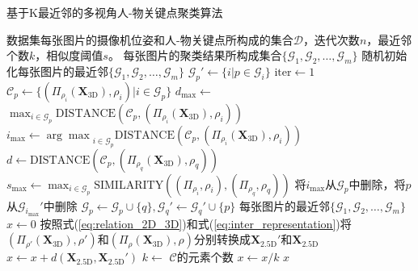 \begin{algorithm}[!htbp]
	\small
	\caption{基于K最近邻的多视角人-物关键点聚类算法}\label{alg:knn}
	\renewcommand{\algorithmicrequire}{\textbf{输入：}}
	\renewcommand{\algorithmicensure}{\textbf{输出：}}
	\begin{algorithmic}[1]
		\Require 数据集每张图片的摄像机位姿和人-物关键点所构成的集合$\mathcal{D}$，迭代次数$n$，最近邻个数$k$，相似度阈值$s$。
		\Ensure 每张图片的聚类结果所构成集合$\{\mathcal{G}_1, \mathcal{G}_2, \dots, \mathcal{G}_m\}$
		\State 随机初始化每张图片的最近邻$\{\mathcal{G}_1, \mathcal{G}_2, \dots, \mathcal{G}_m\}$
		\State $\mathcal{G}_p' \gets \{ i | p \in \mathcal{G}_i \}$
		\EndFor 
		\State $\text{iter} \gets 1$
		\State $\mathcal{C}_p \gets \{(\Pi_{\rho_i}(\mathbf{X}_{\text{3D}}), \rho_i)|i\in\mathcal{G}_p\}$
		\State $d_{\text{max}} \gets $ $\max_{i \in \mathcal{G}_p} \text{DISTANCE}(\mathcal{C}_p, (\Pi_{\rho_i}(\mathbf{X}_{\text{3D}}), \rho_i))$
		\State $i_{\text{max}} \gets {\arg\max}_{i \in \mathcal{G}_p} \text{DISTANCE}(\mathcal{C}_p, (\Pi_{\rho_i}(\mathbf{X}_{\text{3D}}), \rho_i))$
		\State $d \gets \text{DISTANCE}(\mathcal{C}_p, (\Pi_{\rho_q}(\mathbf{X}_{\text{3D}}), \rho_q))$
		\State $s_{\text{max}} \gets \max_{i\in \mathcal{G}_p} \text{SIMILARITY} ((\Pi_{\rho_i}, \rho_i), (\Pi_{\rho_q}, \rho_q))$
		\State 将$i_{\text{max}}$从$\mathcal{G}_p$中删除，将$p$从$\mathcal{G}_{i_{\text{max}}}'$中删除
		\State $\mathcal{G}_p \gets \mathcal{G}_p \cup \{q \}, \mathcal{G}_q' \gets \mathcal{G}_q' \cup\{p\}$
		\EndIf 
		\EndFor
		\EndFor
		\EndFor
		\State \Return 每张图片的最近邻$\{\mathcal{G}_1, \mathcal{G}_2, \dots, \mathcal{G}_m\}$		
		\State $x \gets 0$
		\State 按照式(\ref{eq:relation_2D_3D})和式(\ref{eq:inter_representation})将 $(\Pi_{\rho'} (\mathbf{X}_{\text{3D}}), \rho')$和$(\Pi_{\rho} (\mathbf{X}_{\text{3D}}), \rho)$分别转换成$\mathbf{X}_{\text{2.5D}}'$和$\mathbf{X}_{\text{2.5D}}$
		\State $x \gets x + d(\mathbf{X}_{\text{2.5D}}, \mathbf{X}_{\text{2.5D}}')$
		\EndFor
		\State $k \gets $ $\mathcal{C}$的元素个数
		\State $x \gets x / k$
		\State \Return $x$
		\EndProcedure
	\end{algorithmic}
\end{algorithm}

